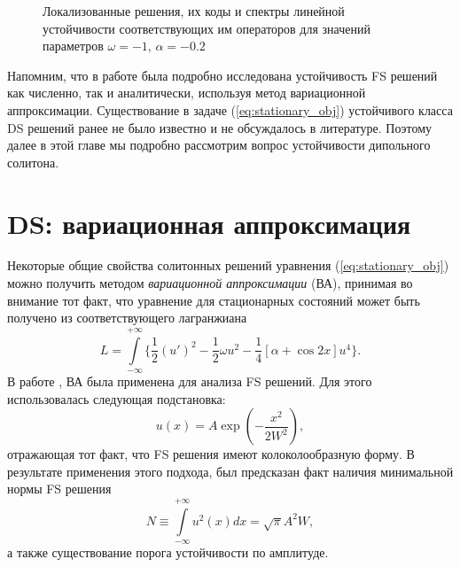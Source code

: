 \begin{figure}
\begin{minipage}[h]{0.5\linewidth}
	\end{minipage}
\caption{Локализованные решения, их коды и спектры линейной устойчивости соответствующих им операторов для значений параметров $\omega = -1$, $\alpha = -0.2$}
\label{pic:stability}
\end{figure}
%

Напомним, что в работе \cite{Malomed} была подробно исследована устойчивость FS решений как численно, так и аналитически, используя метод вариационной аппроксимации.
Существование в задаче (\ref{eq:stationary_obj}) устойчивого класса DS решений ранее не было известно и не обсуждалось в литературе.
Поэтому далее в этой главе мы подробно рассмотрим вопрос устойчивости дипольного солитона.

\section{DS: вариационная аппроксимация}

Некоторые общие свойства солитонных решений уравнения (\ref{eq:stationary_obj}) можно получить методом {\it вариационной аппроксимации} (ВА), принимая во внимание тот факт, что уравнение для стационарных состояний может быть получено из соответствующего лагранжиана
%
\begin{equation}
L = \int \limits_{-\infty}^{+\infty} \Big\{ \dfrac{1}{2} (u')^2 - \dfrac{1}{2} \omega u^2 - \dfrac{1}{4} [\alpha + \cos 2x] u^4 \Big\}.
\label{eq:lagrangian}
\end{equation}
%
В работе \cite{Malomed}, ВА была применена для анализа FS решений.
Для этого использовалась следующая подстановка:
%
\begin{equation}
u(x) = A \exp \left( -\dfrac{x^2}{2 W^2} \right),
\label{ea:fs_ansatz}
\end{equation}
%
отражающая тот факт, что FS решения имеют колоколообразную форму. 
В результате применения этого подхода, был предсказан факт наличия минимальной нормы FS решения
%
\begin{equation}
N \equiv \int \limits_{-\infty}^{+\infty} u^2(x) dx = \sqrt{\pi} A^2 W,
\end{equation}
%
а также существование порога устойчивости по амплитуде.

